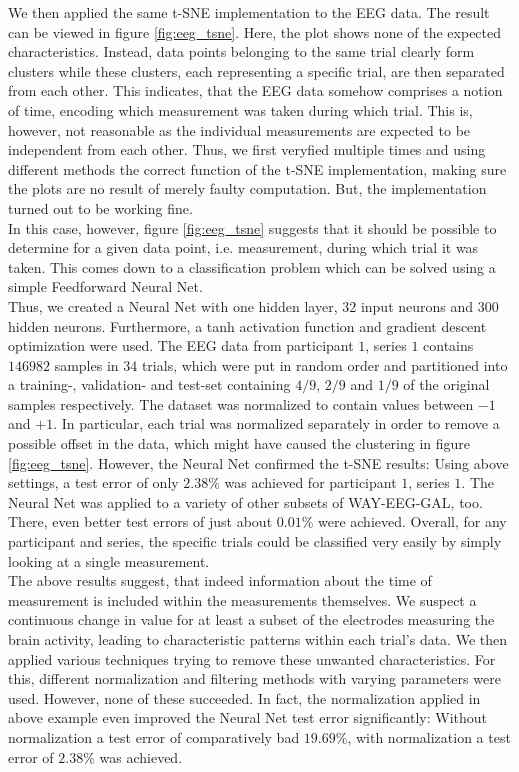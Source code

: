 \documentclass{article} %
\begin{document}
We then applied the same t-SNE implementation to the EEG data. The result can be viewed in figure \ref{fig:eeg_tsne}. Here, the plot shows none of the expected characteristics. Instead, data points belonging to the same trial clearly form clusters while these clusters, each representing a specific trial, are then separated from each other. This indicates, that the EEG data somehow comprises a notion of time, encoding which measurement was taken during which trial. This is, however, not reasonable as the individual measurements are expected to be independent from each other. Thus, we first veryfied multiple times and using different methods the correct function of the t-SNE implementation, making sure the plots are no result of merely faulty computation. But, the implementation turned out to be working fine.\\
In this case, however, figure \ref{fig:eeg_tsne} suggests that it should be possible to determine for a given data point, i.e. measurement, during which trial it was taken. This comes down to a classification problem which can be solved using a simple Feedforward Neural Net.\\
Thus, we created a Neural Net with one hidden layer, $32$ input neurons and $300$ hidden neurons. Furthermore, a tanh activation function and gradient descent optimization were used. The EEG data from participant $1$, series $1$ contains $146982$ samples in $34$ trials, which were put in random order and partitioned into a training-, validation- and test-set containing $4/9$, $2/9$ and $1/9$ of the original samples respectively. The dataset was normalized to contain values between $-1$ and $+1$. In particular, each trial was normalized separately in order to remove a possible offset in the data, which might have caused the clustering in figure \ref{fig:eeg_tsne}.
However, the Neural Net confirmed the t-SNE results: Using above settings, a test error of only $2.38\%$ was achieved for participant $1$, series $1$. The Neural Net was applied to a variety of other subsets of WAY-EEG-GAL, too. There, even better test errors of just about $0.01\%$ were achieved. Overall, for any participant and series, the specific trials could be classified very easily by simply looking at a single measurement.\\
The above results suggest, that indeed information about the time of measurement is included within the measurements themselves. We suspect a continuous change in value for at least a subset of the electrodes measuring the brain activity, leading to characteristic patterns within each trial's data. We then applied various techniques trying to remove these unwanted characteristics. For this, different normalization and filtering methods with varying parameters were used. However, none of these succeeded. In fact, the normalization applied in above example even improved the Neural Net test error significantly: Without normalization a test error of comparatively bad $19.69\%$, with normalization a test error of $2.38\%$ was achieved.
\end{document}
